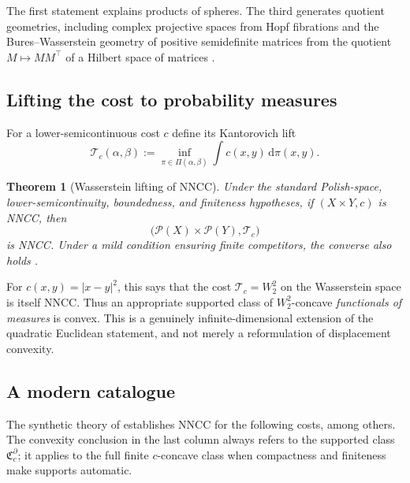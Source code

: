 \documentclass[11pt,a4paper]{article}
\newtheorem{theorem}{Theorem}[section]
\theoremstyle{definition}
\theoremstyle{remark}
\newcommand{\Pcal}{\mathcal P}
\newcommand{\Cfrak}{\mathfrak C}
\newcommand{\dd}{\,\mathrm d}
\begin{document}
The first statement explains products of spheres. The third generates quotient
geometries, including complex projective spaces from Hopf fibrations and the
Bures--Wasserstein geometry of positive semidefinite matrices from the quotient
$M\mapsto MM^\top$ of a Hilbert space of matrices
\citep{KimMcCann2012,LegerTodeschiVialard2025}.

\subsection{Lifting the cost to probability measures}

For a lower-semicontinuous cost $c$ define its Kantorovich lift
\[
  \mathcal T_c(\alpha,\beta)
  :=\inf_{\pi\in\Pi(\alpha,\beta)}\int c(x,y)\dd\pi(x,y).
\]

\begin{theorem}[Wasserstein lifting of NNCC]\label{thm:lifting}
Under the standard Polish-space, lower-semicontinuity, boundedness, and
finiteness hypotheses, if $(X\times Y,c)$ is NNCC, then
\[
  \bigl(\Pcal(X)\times\Pcal(Y),\mathcal T_c\bigr)
\]
is NNCC. Under a mild condition ensuring finite competitors, the converse also
holds \citep{LegerTodeschiVialard2025}.
\end{theorem}

For $c(x,y)=\lvert x-y\rvert^2$, this says that the cost
$\mathcal T_c= W_2^2$ on the Wasserstein space is itself NNCC. Thus an
appropriate supported class of $W_2^2$-concave \emph{functionals of measures}
is convex. This is a genuinely infinite-dimensional extension of the
quadratic Euclidean statement, and not merely a reformulation of displacement
convexity.

\subsection{A modern catalogue}

The synthetic theory of \citet{LegerTodeschiVialard2025} establishes NNCC for
the following costs, among others. The convexity conclusion in the last column
always refers to the supported class $\Cfrak_c^\partial$; it applies to the full
finite $c$-concave class when compactness and finiteness make supports
automatic.
\end{document}
